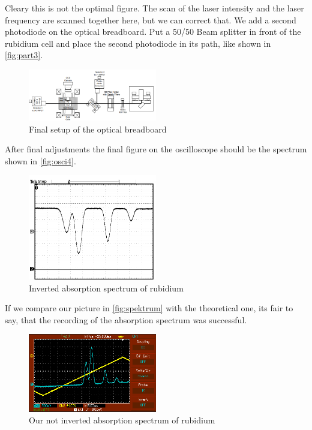 Cleary this is not the optimal figure.
The scan of the laser intensity and the laser frequency are scanned together here, but we can correct that.
We add a second photodiode on the optical breadboard.
Put a 50/50 Beam splitter in front of the rubidium cell and place the second photodiode in its path, like shown in \autoref{fig:part3}.

\begin{figure}
    \centering
    \includegraphics[width=0.5\textwidth]{images/part3.png}
    \caption{Final setup of the optical breadboard \cite{V60}}
    \label{fig:part3}
\end{figure}

After final adjustments the final figure on the oscilloscope should be the spectrum shown in \autoref{fig:osci4}.

\begin{figure}
    \centering
    \includegraphics[width=0.5\textwidth]{images/oszi2.png}
    \caption{Inverted absorption spectrum of rubidium \cite{V60}}
    \label{fig:osci4}
\end{figure}

If we compare our picture in \autoref{fig:spektrum} with the theoretical one, its fair to say, that the recording of the absorption spectrum was successful.

\begin{figure}
    \centering
    \includegraphics[width=0.5\textwidth]{images/spektrum.png}
    \caption{Our not inverted absorption spectrum of rubidium}
    \label{fig:spektrum}
\end{figure}
